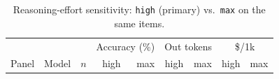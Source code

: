 \begin{table}[t]
\centering\small
\caption{Reasoning-effort sensitivity: \texttt{high} (primary) vs.\ \texttt{max} on the same items.}
\label{tab:effort}
\begin{tabular}{@{}llrrrrrrr@{}}
\toprule
& & & \multicolumn{2}{c}{Accuracy (\%)} & \multicolumn{2}{c}{Out tokens} & \multicolumn{2}{c}{\$/1k} \\
Panel & Model & $n$ & high & max & high & max & high & max \\
\midrule

\bottomrule
\end{tabular}
\end{table}
